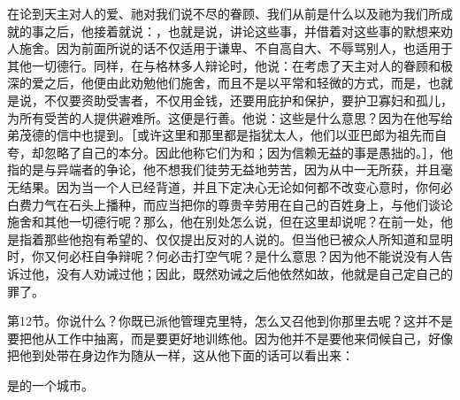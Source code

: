在论到天主对人的爱、祂对我们说不尽的眷顾、我们从前是什么以及祂为我们所成就的事之后，他接着就说：，也就是说，讲论这些事，并借着对这些事的默想来劝人施舍。因为前面所说的话不仅适用于谦卑、不自高自大、不辱骂别人，也适用于其他一切德行。同样，在与格林多人辩论时，他说：在考虑了天主对人的眷顾和极深的爱之后，他便由此劝勉他们施舍，而且不是以平常和轻微的方式，而是，也就是说，不仅要资助受害者，不仅用金钱，还要用庇护和保护，要护卫寡妇和孤儿，为所有受苦的人提供避难所。这便是行善。他说：这些是什么意思？因为在他写给弟茂德的信中也提到。［或许这里和那里都是指犹太人，他们以亚巴郎为祖先而自夸，却忽略了自己的本分。因此他称它们为和；因为信赖无益的事是愚拙的。］，他指的是与异端者的争论，他不想我们徒劳无益地劳苦，因为从中一无所获，并且毫无结果。因为当一个人已经背道，并且下定决心无论如何都不改变心意时，你何必白费力气在石头上播种，而应当把你的尊贵辛劳用在自己的百姓身上，与他们谈论施舍和其他一切德行呢？那么，他在别处怎么说，但在这里却说呢？在前一处，他是指着那些他抱有希望的、仅仅提出反对的人说的。但当他已被众人所知道和显明时，你又何必枉自争辩呢？何必击打空气呢？是什么意思？因为他不能说没有人告诉过他，没有人劝诫过他；因此，既然劝诫之后他依然如故，他就是自己定自己的罪了。\par

第12节。你说什么？你既已派他管理克里特，怎么又召他到你那里去呢？这并不是要把他从工作中抽离，而是要更好地训练他。因为他并不是要他来伺候自己，好像把他到处带在身边作为随从一样，这从他下面的话可以看出来：\par

\par

是的一个城市。\par

